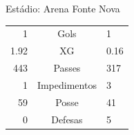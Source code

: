 \documentclass[11pt]{article}
\begin{document}
\vspace{0.5cm}
\begin{minipage}{0.65\textwidth}
\begin{center}
\begin{tabular}{rl}
\end{tabular}
\end{center}
\end{minipage}
\begin{minipage}{0.3\textwidth}
Estádio: Arena Fonte Nova\\
\begin{tabular}{rcl}
1 & Gols & 1 \\
1.92 & XG & 0.16 \\
443 & Passes & 317 \\
1 & Impedimentos & 3 \\
59 & Posse & 41 \\
0 & Defesas & 5 \\
\end{tabular}
\end{minipage}
\newpage
\end{document}
